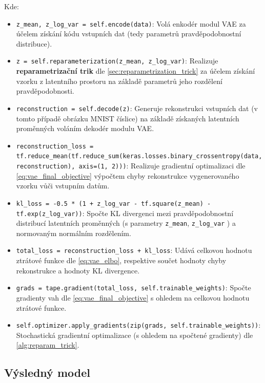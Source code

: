 Kde:
\begin{itemize}
    \item \lstinline{z_mean, z_log_var = self.encode(data)}: Volá enkodér modul VAE za účelem získání kódu vstupních dat (tedy parametrů pravděpodobnostní distribuce).
    \item \lstinline{z = self.reparameterization(z_mean, z_log_var)}: Realizuje \textbf{reparametrizační trik} dle \autoref{sec:reparametrization_trick} za účelem získání vzorku z latentního prostoru na základě parametrů jeho rozdělení pravděpodobnosti.
    \item \lstinline{reconstruction = self.decode(z)}: Generuje rekonstrukci vstupních dat (v tomto případě obrázku MNIST číslice) na základě získaných latentních proměnných voláním dekodér modulu VAE.
    \item \lstinline{reconstruction_loss = tf.reduce_mean(tf.reduce_sum(keras.losses.binary_crossentropy(data, reconstruction), axis=(1, 2)))}: Realizuje gradientní optimalizaci dle \autoref{eq:vae_final_objective} výpočtem chyby rekonstrukce vygenerovaného vzorku vůči vstupním datům.
    \item \lstinline{kl_loss = -0.5 * (1 + z_log_var - tf.square(z_mean) - tf.exp(z_log_var))}: Spočte KL divergenci mezi pravděpodobnostní distribucí latentních proměnných (s parametry \lstinline{z_mean}, \lstinline{z_log_var} ) a normovaným normálním rozdělením.
    \item \lstinline{total_loss = reconstruction_loss + kl_loss}: Udává celkovou hodnotu ztrátové funkce dle \autoref{eq:vae_elbo}, respektive součet hodnoty chyby rekonstrukce a hodnoty KL divergence.
    \item \lstinline{grads = tape.gradient(total_loss, self.trainable_weights)}: Spočte gradienty vah dle \autoref{eq:vae_final_objective} s ohledem na celkovou hodnotu ztrátové funkce.
    \item \lstinline{self.optimizer.apply_gradients(zip(grads, self.trainable_weights))}: Stochastická gradientní optimalizace (s ohledem na spočtené gradienty) dle \autoref{alg:reparam_trick}.
\end{itemize}

\subsection{Výsledný model}
\label{sec:vae_prepared_model}



